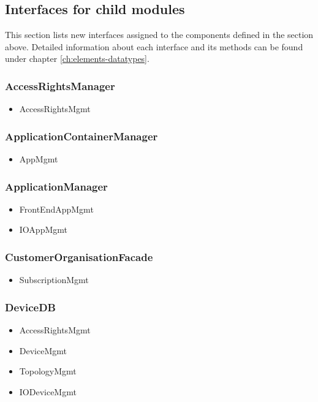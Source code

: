 \subsection*{Interfaces for child modules}
    This section lists new interfaces assigned to the components defined
    in the section above. Detailed information about each interface and
    its methods can be found under chapter \ref{ch:elements-datatypes}.

    \subsubsection{AccessRightsManager}
        \begin{itemize}
            \item AccessRightsMgmt
        \end{itemize}

    \subsubsection{ApplicationContainerManager}
        \begin{itemize}
            \item AppMgmt
        \end{itemize}

    \subsubsection{ApplicationManager}
        \begin{itemize}
            \item FrontEndAppMgmt
            \item IOAppMgmt
        \end{itemize}

    \subsubsection{CustomerOrganisationFacade}
        \begin{itemize}
            \item SubscriptionMgmt
        \end{itemize}

    \subsubsection{DeviceDB}
        \begin{itemize}
            \item AccessRightsMgmt
            \item DeviceMgmt
            \item TopologyMgmt
            \item IODeviceMgmt
        \end{itemize}

